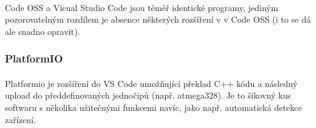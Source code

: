 \documentclass[12pt]{article}
\begin{document}
\begin{spacing}{1.5}
	\paragraph{} Code OSS a Vicual Studio Code jsou téměř identické programy, jediným pozorovatelným rozdílem je absence některých rozšíření v  v Code OSS (i to se dá ale snadno opravit).
	
	\subsubsection*{PlatformIO}
	\paragraph{} Platformio je rozšíření do VS Code umožňující překlad C++ kódu a následný upload do předdefinovaných jednočipů (např. atmega328). Je to šikovný kus softwaru s několika užitečnými funkcemi navíc, jako např. automatická detekce zařízení.
	
\end{spacing}
\end{document}
